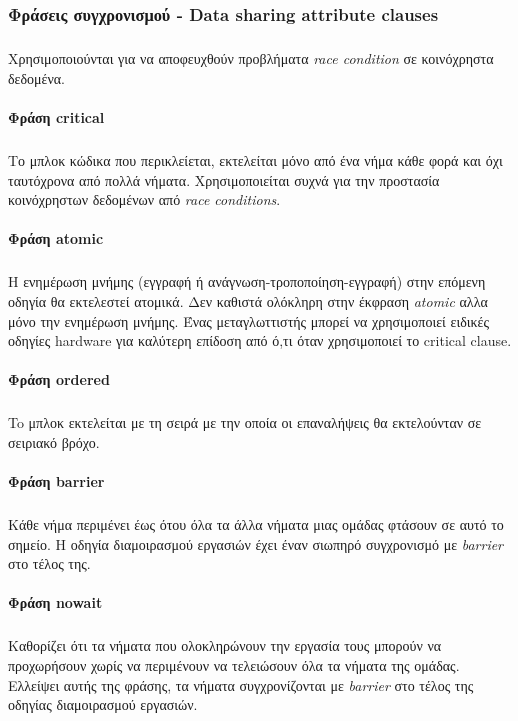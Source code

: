 \documentclass[12pt]{article}
\newcommand{\en}[1]{\foreignlanguage{english}{#1}}
\begin{document}
\subsubsection{Φράσεις συγχρονισμού - \en{Data sharing attribute clauses}}
\subparagraph{}
Χρησιμοποιούνται για να αποφευχθούν προβλήματα \emph{\en{race condition}} σε κοινόχρηστα δεδομένα.

\paragraph{Φράση \en{critical}} 
\subparagraph{}
Το μπλοκ κώδικα που περικλείεται, εκτελείται μόνο από ένα νήμα κάθε φορά και όχι ταυτόχρονα από πολλά νήματα. Χρησιμοποιείται συχνά για την προστασία κοινόχρηστων δεδομένων από \emph{\en{race conditions}}.

\paragraph{Φράση \en{atomic}}
\subparagraph{}
H ενημέρωση μνήμης (εγγραφή ή ανάγνωση-τροποποίηση-εγγραφή) στην επόμενη οδηγία θα εκτελεστεί ατομικά. Δεν καθιστά ολόκληρη στην έκφραση \emph{\en{atomic}} αλλα μόνο την ενημέρωση μνήμης. Ένας μεταγλωττιστής μπορεί να χρησιμοποιεί ειδικές οδηγίες \en{hardware} για καλύτερη επίδοση από ό,τι όταν χρησιμοποιεί το \en{critical clause}.
      
      
\paragraph{Φράση \en{ordered}}
\subparagraph{}
To μπλοκ εκτελείται με τη σειρά με την οποία οι επαναλήψεις θα εκτελούνταν σε σειριακό βρόχο.

\paragraph{Φράση \en{barrier}}
\subparagraph{}
Kάθε νήμα περιμένει έως ότου όλα τα άλλα νήματα μιας ομάδας φτάσουν σε αυτό το σημείο. Η οδηγία διαμοιρασμού εργασιών έχει έναν σιωπηρό συγχρονισμό με \emph{\en{barrier}} στο τέλος της.
\clearpage
\paragraph{Φράση \en{nowait}}
\subparagraph{}
Καθορίζει ότι τα νήματα που ολοκληρώνουν την εργασία τους μπορούν να προχωρήσουν χωρίς να περιμένουν να τελειώσουν όλα τα νήματα της ομάδας. Ελλείψει αυτής της φράσης, τα νήματα συγχρονίζονται με \emph{\en{barrier}} στο τέλος της οδηγίας διαμοιρασμού εργασιών.
\end{document}
